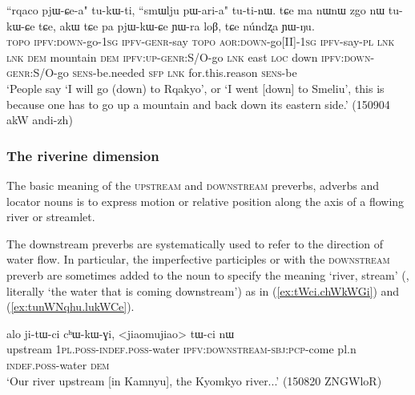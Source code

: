  \begin{exe}
\ex \label{ex:rqaco.pjWCea}
\gll ``rqaco pjɯ-ɕe-a" tu-kɯ-ti, ``smɯlju pɯ-ari-a" tu-ti-nɯ. tɕe ma nɯnɯ zgo nɯ tu-kɯ-ɕe tɕe, akɯ tɕe pa pjɯ-kɯ-ɕe ɲɯ-ra loβ, tɕe núndʐa ɲɯ-ŋu. \\
\textsc{topo} \textsc{ipfv}:\textsc{down}-go-\textsc{1sg} \textsc{ipfv}-\textsc{genr}-say  \textsc{topo} \textsc{aor}:\textsc{down}-go[II]-\textsc{1sg} \textsc{ipfv}-say-\textsc{pl} \textsc{lnk} \textsc{lnk} \textsc{dem} mountain \textsc{dem} \textsc{ipfv}:\textsc{up}-\textsc{genr}:S/O-go \textsc{lnk} east \textsc{loc} down \textsc{ipfv}:\textsc{down}-\textsc{genr}:S/O-go \textsc{sens}-be.needed \textsc{sfp} \textsc{lnk} for.this.reason \textsc{sens}-be \\
\glt `People say `I will go (down) to Rqakyo', or `I went [down] to Smeliu', this is because one has to go up a mountain and back down its eastern side.' (150904 akW andi-zh) 
\end{exe}

\subsubsection{The riverine dimension} \label{sec:riverine.dimension}
The basic meaning of the \textsc{upstream} and \textsc{downstream} preverbs, adverbs and locator nouns is to express motion or relative position along the axis of a flowing river or streamlet.

The downstream preverbs are systematically used to refer to the direction of water flow. In particular, the imperfective participles  or  with the \textsc{downstream} preverb are sometimes added to the noun  to specify the meaning `river, stream' (, literally `the water that is coming downstream') as in (\ref{ex:tWci.chWkWGi}) and (\ref{ex:tunWNqhu.lukWCe}).

 \begin{exe}
\ex \label{ex:tWci.chWkWGi}
\gll  alo ji-tɯ-ci cʰɯ-kɯ-ɣi, <jiaomujiao> tɯ-ci nɯ    \\
 upstream \textsc{1pl}.\textsc{poss}-\textsc{indef}.\textsc{poss}-water \textsc{ipfv}:\textsc{downstream}-\textsc{sbj}:\textsc{pcp}-come pl.n \textsc{indef}.\textsc{poss}-water \textsc{dem} \\
\glt `Our river upstream [in Kamnyu], the Kyomkyo river...' (150820 ZNGWloR)
\end{exe}

